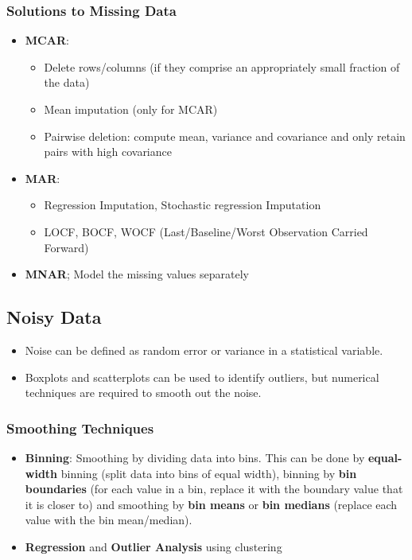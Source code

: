 \documentclass{article}
\theoremstyle{plain}
\theoremstyle{definition}
\begin{document}
\subsubsection{Solutions to Missing Data}
\begin{itemize}
    \item \textbf{MCAR}:
    \begin{itemize}
        \item Delete rows/columns (if they comprise an appropriately small fraction of the data)
        
        \item Mean imputation (only for MCAR)
        
        \item Pairwise deletion: compute mean, variance and covariance and only retain pairs with high covariance
    \end{itemize}
    
    \item \textbf{MAR}:
    \begin{itemize}
        \item Regression Imputation, Stochastic regression Imputation
        
        \item LOCF, BOCF, WOCF (Last/Baseline/Worst Observation Carried Forward)
    \end{itemize}
    
    \item \textbf{MNAR};
    Model the missing values separately
\end{itemize}

\subsection{Noisy Data}
\begin{itemize}
    \item Noise can be defined as random error or variance in a statistical variable. 
    
    \item Boxplots and scatterplots can be used to identify outliers, but numerical techniques are required to smooth out the noise.
\end{itemize}
\subsubsection{Smoothing Techniques}
\begin{itemize}
    \item \textbf{Binning}: Smoothing by dividing data into bins. This can be done by \textbf{equal-width} binning (split data into bins of equal width), binning by \textbf{bin boundaries} (for each value in a bin, replace it with the boundary value that it is closer to) and smoothing by \textbf{bin means} or \textbf{bin medians} (replace each value with the bin mean/median). 
    
    \item \textbf{Regression} and \textbf{Outlier Analysis} using clustering
\end{itemize}
\end{document}
